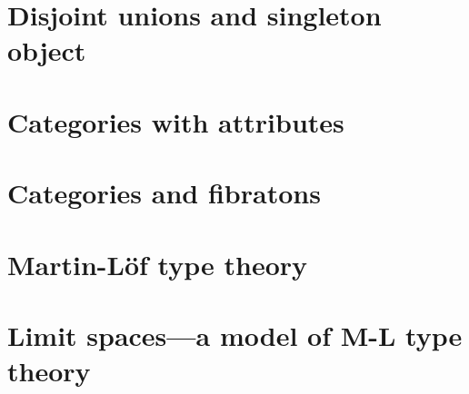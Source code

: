 
\lipsum[19]

\section{Disjoint unions and singleton object} \label{sec:source-3-1}

\lipsum[20]

\section{Categories with attributes} \label{sec:source-3-2}

\lipsum[21]

\section{Categories and fibratons} \label{sec:source-3-3}

\lipsum[22]

\section{Martin-L\"of type theory} \label{sec:source-3-4}

\lipsum[23]

\section{Limit spaces---a model of M-L type theory} \label{sec:source-3-5}

\lipsum[24]

